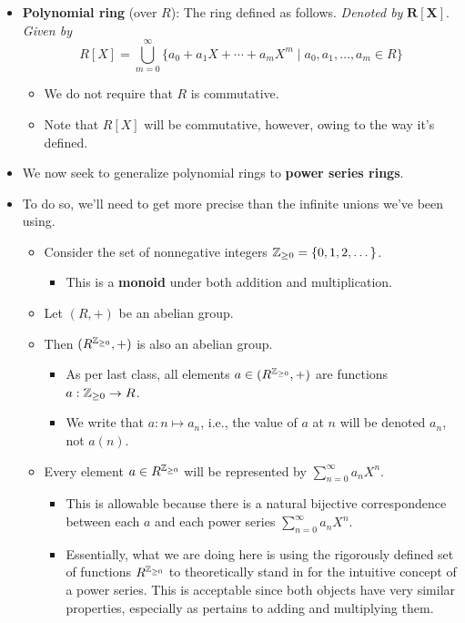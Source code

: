 \documentclass[../notes.tex]{subfiles}
\begin{document}
\begin{itemize}
\begin{itemize}
\begin{itemize}
        \end{itemize}
    \end{itemize}
    \item \textbf{Polynomial ring} (over $R$): The ring defined as follows. \emph{Denoted by} $\bm{R[X]}$. \emph{Given by}
    \begin{equation*}
        R[X] = \bigcup_{m=0}^\infty\{a_0+a_1X+\cdots+a_mX^m\mid a_0,a_1,\dots,a_m\in R\}
    \end{equation*}
    \begin{itemize}
        \item We do not require that $R$ is commutative.
        \item Note that $R[X]$ will be commutative, however, owing to the way it's defined.
    \end{itemize}
    \item We now seek to generalize polynomial rings to \textbf{power series rings}.
    \item To do so, we'll need to get more precise than the infinite unions we've been using.
    \begin{itemize}
        \item Consider the set of nonnegative integers ${\mathbb{Z}_{\geq 0}}=\{0,1,2,\dots\}$.
        \begin{itemize}
            \item This is a \textbf{monoid} under both addition and multiplication.
        \end{itemize}
        \item Let $(R,+)$ be an abelian group.
        \item Then $(R^{\mathbb{Z}_{\geq 0}},+)$ is also an abelian group.
        \begin{itemize}
            \item As per last class, all elements $a\in(R^{\mathbb{Z}_{\geq 0}},+)$ are functions $a:{\mathbb{Z}_{\geq 0}}\to R$.
            \item We write that $a:n\mapsto a_n$, i.e., the value of $a$ at $n$ will be denoted $a_n$, not $a(n)$.
        \end{itemize}
        \item Every element $a\in R^{\mathbb{Z}_{\geq 0}}$ will be represented by $\sum_{n=0}^\infty a_nX^n$.
        \begin{itemize}
            \item This is allowable because there is a natural bijective correspondence between each $a$ and each power series $\sum_{n=0}^\infty a_nX^n$.
            \item Essentially, what we are doing here is using the rigorously defined set of functions $R^{\mathbb{Z}_{\geq 0}}$ to theoretically stand in for the intuitive concept of a power series. This is acceptable since both objects have very similar properties, especially as pertains to adding and multiplying them.

\end{itemize}
\end{itemize}
\end{itemize}
\end{document}

